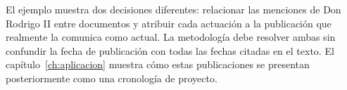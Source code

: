 El ejemplo muestra dos decisiones diferentes: relacionar las menciones de
Don Rodrigo II entre documentos y atribuir cada actuación a la publicación
que realmente la comunica como actual. La metodología debe resolver ambas
sin confundir la fecha de publicación con todas las fechas citadas en el texto.
El capítulo~\ref{ch:aplicacion} muestra cómo estas publicaciones se presentan
posteriormente como una cronología de proyecto.
